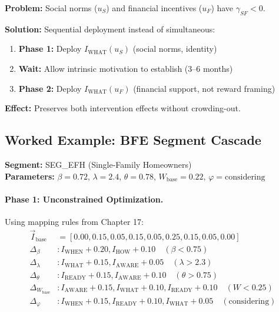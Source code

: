 \begin{tcolorbox}[colback=red!5!white, colframe=red!75!black,
    title=\textbf{C2 Mitigation: Temporal Sequencing}]
\textbf{Problem:} Social norms ($u_S$) and financial incentives ($u_F$) have $\gamma_{SF} < 0$.

\textbf{Solution:} Sequential deployment instead of simultaneous:
\begin{enumerate}[nosep]
    \item \textbf{Phase 1:} Deploy $I_{\text{WHAT}}(u_S)$ (social norms, identity)
    \item \textbf{Wait:} Allow intrinsic motivation to establish (3--6 months)
    \item \textbf{Phase 2:} Deploy $I_{\text{WHAT}}(u_F)$ (financial support, not reward framing)
\end{enumerate}

\textbf{Effect:} Preserves both intervention effects without crowding-out.
\end{tcolorbox}

\subsection{Worked Example: BFE Segment Cascade}
\label{sec:hhh-cascade-example}

\textbf{Segment:} SEG\_EFH (Single-Family Homeowners) \\
\textbf{Parameters:} $\beta = 0.72$, $\lambda = 2.4$, $\theta = 0.78$, $W_{\text{base}} = 0.22$, $\varphi = \text{considering}$

\paragraph{Phase 1: Unconstrained Optimization.}
Using mapping rules from Chapter 17:
\begin{align*}
\vec{I}_{\text{base}} &= [0.00, 0.15, 0.05, 0.15, 0.05, 0.25, 0.15, 0.05, 0.00] \\
\Delta_\beta &: I_{\text{WHEN}} + 0.20, I_{\text{HOW}} + 0.10 \quad (\beta < 0.75) \\
\Delta_\lambda &: I_{\text{WHAT}} + 0.15, I_{\text{AWARE}} + 0.05 \quad (\lambda > 2.3) \\
\Delta_\theta &: I_{\text{READY}} + 0.15, I_{\text{AWARE}} + 0.10 \quad (\theta > 0.75) \\
\Delta_{W_{\text{base}}} &: I_{\text{AWARE}} + 0.15, I_{\text{WHAT}} + 0.10, I_{\text{READY}} + 0.10 \quad (W < 0.25) \\
\Delta_\varphi &: I_{\text{WHEN}} + 0.15, I_{\text{READY}} + 0.10, I_{\text{WHAT}} + 0.05 \quad (\text{considering})
\end{align*}


